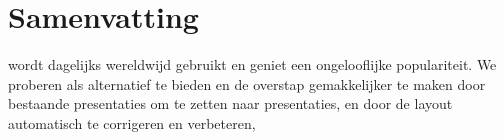 
 \chapter*{Samenvatting}

  \ppt* wordt dagelijks wereldwijd gebruikt en geniet een ongelooflijke
  populariteit. We proberen \mxp als alternatief te bieden en de overstap
  gemakkelijker te maken door bestaande \ppt presentaties om te zetten naar
  \mxp presentaties, en door de layout automatisch te corrigeren en verbeteren, 


